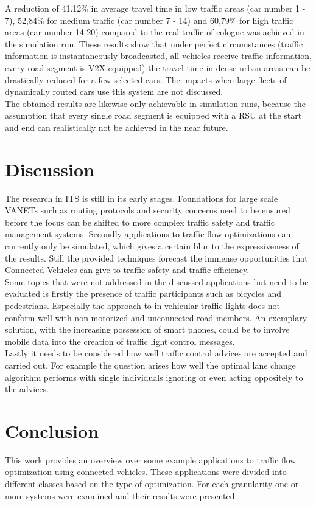 \documentclass{sig-alternate}
\begin{document}
A reduction of 41.12\%  in average travel time in low traffic areas (car number 1 - 7), 52,84\% for medium traffic (car number 7 - 14) and 60,79\% for high traffic areas (car number 14-20) compared to the real traffic of cologne was achieved in the simulation run. These results show that under perfect circumstances (traffic information is instantaneously broadcasted, all vehicles receive traffic information, every road segment is V2X equipped) the travel time in dense urban areas can be drastically reduced for a few selected cars. The impacts when large fleets of dynamically routed cars use this system are not discussed. \\ The obtained results are likewise only achievable in simulation runs, because the assumption that every single road segment is equipped with a RSU at the start and end can realistically not be achieved in the near future. 


\section{Discussion}
The research in ITS is still in its early stages. Foundations for large scale VANETs such as routing protocols and security concerns need to be ensured before the focus can be shifted to more complex traffic safety and traffic management systems. Secondly applications to traffic flow optimizations can currently only be simulated, which gives a certain blur to the expressiveness of the results. Still the provided techniques forecast the immense opportunities that Connected Vehicles can give to traffic safety and traffic efficiency. \\
Some topics that were not addressed in the discussed applications but need to be evaluated is firstly the presence of traffic participants such as bicycles and pedestrians. Especially the approach to in-vehicular traffic lights does not conform well with non-motorized and unconnected road members. An exemplary solution, with the increasing possession of smart phones, could be to involve mobile data into the creation of traffic light control messages. \\
Lastly it needs to be considered how well traffic control advices are accepted and carried out. For example the question arises how well the optimal lane change algorithm performs with single individuals ignoring or even acting oppositely to the advices.   

\section{Conclusion}
This work provides an overview over some example applications to traffic flow optimization using connected vehicles. These applications were divided into different classes based on the type of optimization. For each granularity one or more systems were examined and their results were presented. 
\end{document}
